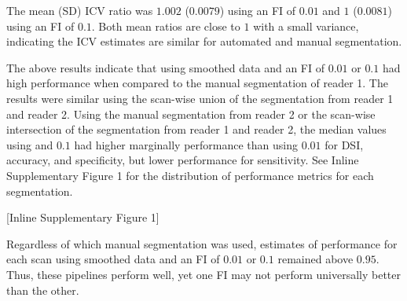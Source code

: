 \documentclass{elsarticle}\usepackage[]{graphicx}\usepackage[]{color}
\begin{document}
The mean (SD) ICV ratio was $1.002$ ($0.0079$) using an FI of $0.01$ and $1$ ($0.0081$) using an FI of $0.1$.  Both mean ratios are close to $1$ with a small variance, indicating the ICV estimates are similar for automated and manual segmentation. 

The above results indicate that using smoothed data and an FI of $0.01$ or $0.1$ had high performance when compared to the manual segmentation of reader 1.  The results were similar using the scan-wise union of the segmentation from reader 1 and reader 2.  Using the manual segmentation from reader 2 or the scan-wise intersection of the segmentation from reader 1 and reader 2, the median values using and $0.1$ had higher marginally performance than using $0.01$ for DSI, accuracy, and specificity, but lower performance for sensitivity.  See Inline Supplementary Figure 1 for the distribution of performance metrics for each segmentation.

[Inline Supplementary Figure 1]

Regardless of which manual segmentation was used, estimates of performance for each scan using smoothed data and an FI of $0.01$ or $0.1$ remained above $0.95$.  Thus, these pipelines perform well, yet one FI may not perform universally better than the other.  

% 
% 
\end{document}
